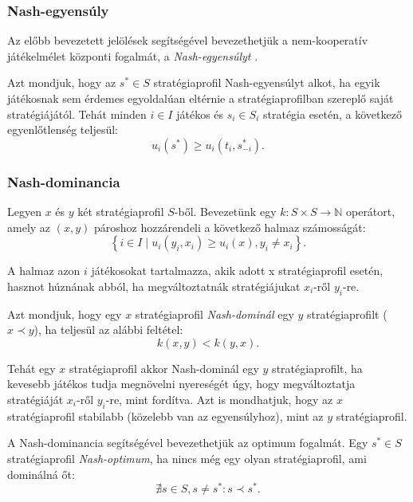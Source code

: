 \subsubsection{Nash-egyensúly}
Az előbb bevezetett jelölések segítségével bevezethetjük a nem-kooperatív játékelmélet központi fogalmát, a \emph{Nash-egyensúlyt} \cite{nash1951non}.

\begin{ert}
  Azt mondjuk, hogy az $s^* \in S$ stratégiaprofil Nash-egyensúlyt alkot,
  ha egyik játékosnak sem érdemes egyoldalúan eltérnie a stratégiaprofilban szereplő saját stratégiájától.
  Tehát minden $i \in I$ játékos és $s_i \in S_i$ stratégia esetén, a következő egyenlőtlenség teljesül:
  \[
    u_i\left(s^*\right) \ge u_i\left(t_i, s_{-i}^*\right).
  \]
\end{ert}


\subsubsection{Nash-dominancia}
Legyen $x$ és $y$ két stratégiaprofil $S$-ből.
Bevezetünk egy $k \colon S \times S \to \mathbb{N}$ operátort, amely az $\left( x, y \right)$ pároshoz hozzárendeli a következő halmaz számosságát:
\[
  \left\{ i \in I \mid u_i(y_i, x_i) \ge u_i(x), y_i \neq x_i \right\}.
\]

A halmaz azon $i$ játékosokat tartalmazza, akik adott x stratégiaprofil esetén, hasznot húznának abból, ha megváltoztatnák stratégiájukat $x_i$-ről $y_i$-re.

\begin{ert}
  Azt mondjuk, hogy egy $x$ stratégiaprofil \emph{Nash-dominál} egy $y$ stratégiaprofilt ($x \prec y$), ha teljesül az alábbi feltétel:
  \[
    k(x,y) < k(y, x).
  \]

  Tehát egy $x$ stratégiaprofil akkor Nash-dominál egy $y$ stratégiaprofilt, ha kevesebb játékos tudja megnövelni nyereségét úgy, hogy megváltoztatja stratégiáját $x_i$-ről $y_i$-re, mint fordítva.
  Azt is mondhatjuk, hogy az $x$ stratégiaprofil stabilabb (közelebb van az egyensúlyhoz), mint az $y$ stratégiaprofil.
\end{ert}


\begin{ert}
  A Nash-dominancia segítségével bevezethetjük az optimum fogalmát.
  Egy $s^* \in S$ stratégiaprofil \emph{Nash-optimum}, ha nincs még egy olyan stratégiaprofil, ami dominálná őt:
  \[
    \nexists s \in S, s \neq s^* \colon s \prec s^*.
  \]
\end{ert}


